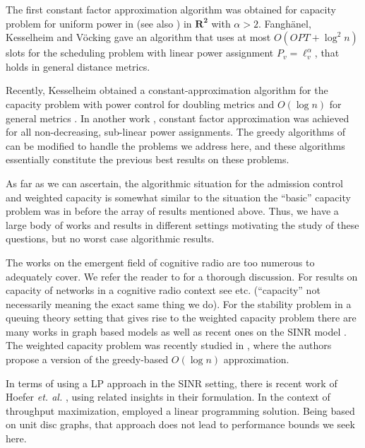 \documentclass[11pt]{amsart}
\begin{document}
The first constant factor approximation algorithm was obtained for
capacity problem for uniform power in \cite{GHWW09} (see also
\cite{HW09}) in $\mathbf{R^2}$ with $\alpha > 2$.
Fangh\"anel, Kesselheim and V\"ocking \cite{FKV09} gave an algorithm
that uses at most $O(OPT + \log^2 n)$ slots for the scheduling problem
with linear power assignment $P_v = \ell_v^\alpha$,
that holds in general distance metrics.

Recently, Kesselheim obtained 
a constant-approximation algorithm
for the capacity problem with power control for doubling metrics
and $O(\log n)$ for general metrics \cite{KesselheimSoda11}. In another work \cite{SODA11}, constant
factor approximation was achieved for all non-decreasing, sub-linear power assignments.
The greedy algorithms of \cite{GHWW09,HW09,SODA11} can be modified to handle the problems
we address here, and these algorithms essentially constitute the previous best results on these 
problems.

As far as we can ascertain, the algorithmic situation for the admission control and weighted capacity
is somewhat similar to the situation the ``basic'' capacity problem was in before the array of results
mentioned above. Thus, we have a large body of works and results in different settings motivating
the study of these questions, but no worst case algorithmic results.

The  works on the emergent field of cognitive radio are too numerous to adequately cover. We refer the reader to  \cite{Bahl:2009:WSN:1592568.1592573} for a  thorough discussion. For results on capacity of networks
in a cognitive radio context see \cite{jafarjournal,shiicccn} etc. (``capacity'' not necessarily meaning the exact same thing we do). For the stability problem in a queuing theory setting
that gives rise to the weighted capacity problem there are many works in graph based models \cite{DBLP:conf/infocom/SharmaMS06,bestInfocom08,DBLP:conf/mobihoc/LiBX09} as well as recent
ones on the SINR model \cite{lqfmobihoc}.  The weighted capacity problem was recently studied in \cite{wanwireless}, where the authors propose a version of the greedy-based $O(\log n)$ approximation. 

In terms of using a LP approach in the SINR setting, there is recent work of Hoefer \emph{et. al.} \cite{hoeferspaa}, using 
related insights in their formulation. In the context of throughput maximization, \cite{CKMPS08} employed a linear programming solution. Being based on unit disc graphs, that approach  does not lead to performance bounds we seek here.
\end{document}
